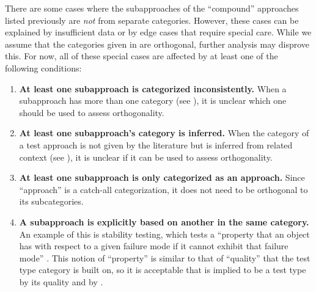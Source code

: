 There are some cases where the subapproaches of the ``compound'' approaches
listed previously are \emph{not} from separate categories. However, these cases
can be explained by insufficient data or by edge cases that require special care.
While we assume that the categories given in  are
orthogonal, further analysis may disprove this. For now, all of these special
cases are affected by at least one of the following conditions:
\begin{enumerate}
    \item \textbf{At least one subapproach is categorized inconsistently.}
          When a subapproach has more than one category (see ),
          it is unclear which one should be used to assess orthogonality.
    \item \textbf{At least one subapproach's category is inferred.} When the category
          of a test approach is not given by the literature but is inferred
          from related context (see ), it is unclear if it can
          be used to assess orthogonality.
    \item \textbf{At least one subapproach is only categorized as an approach.}
          Since ``approach'' is a catch-all categorization, it does not
          need to be orthogonal to its subcategories.
    \item \textbf{A subapproach is explicitly based on another in the same
              category.} An example of this is stability testing, which
          tests a ``property that an object has with respect to a given
          failure mode if it cannot exhibit that failure mode''
          \citep[p.~434]{IEEE2017}. This notion of
          ``property'' is similar to that of ``quality'' that the test type
          category is built on, so it is acceptable that is implied to be
          a test type by its quality \citep[p.~434]{IEEE2017}%
           and by \citet[p.~55]{Firesmith2015}.
\end{enumerate}